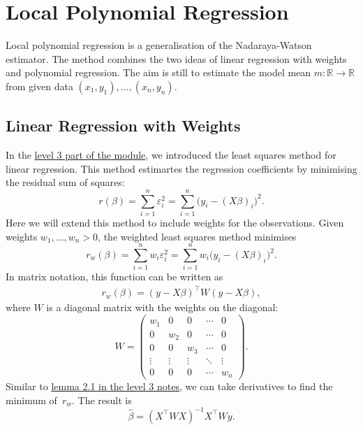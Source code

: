 \documentclass[
  a4paper,
]{article}
\theoremstyle{definition}
\theoremstyle{definition}
\theoremstyle{definition}
\theoremstyle{definition}
\theoremstyle{remark}
\begin{document}
\clearpage

\section{Local Polynomial Regression}\label{X05-locpoly}

Local polynomial regression is a generalisation of the
Nadaraya-Watson estimator. The method combines the two ideas of
linear regression with weights and polynomial regression. The aim
is still to estimate the model mean \(m \colon\mathbb{R}\to \mathbb{R}\) from
given data \((x_1, y_1), \ldots, (x_n, y_n)\).

\subsection{Linear Regression with Weights}\label{linear-regression-with-weights}

In the \href{https://seehuhn.github.io/MATH3714/S02-multiple.html\#the-normal-equations}{level 3 part of the module},
we introduced the least squares method for linear regression. This method
estimartes the regression coefficients by minimising the residual sum of
squares:
\begin{equation*}
  r(\beta)
  = \sum_{i=1}^n \varepsilon_i^2
  = \sum_{i=1}^n \bigl( y_i - (X\beta)_i \bigr)^2.
\end{equation*}
Here we will extend this method to include weights for the observations.
Given weights
\(w_1, \ldots, w_n > 0\), the weighted least squares method minimises
\begin{equation*}
  r_w(\beta)
  = \sum_{i=1}^n w_i \varepsilon_i^2
  = \sum_{i=1}^n w_i \bigl( y_i - (X\beta)_i \bigr)^2.
\end{equation*}
In matrix notation, this function can be written as
\begin{align*}
  r_w(\beta)
  = (y - X \beta)^\top W (y - X \beta),
\end{align*}
where \(W\) is a diagonal matrix with the weights on the diagonal:
\begin{equation}
  W
  = \begin{pmatrix}
      w_1 & 0 & 0 & \cdots & 0 \\
      0 & w_2 & 0 & \cdots & 0 \\
      0 & 0 & w_3 & \cdots & 0 \\
      \vdots & \vdots & \vdots & \ddots & \vdots \\
      0 & 0 & 0 & \cdots & w_n
    \end{pmatrix}.  \label{eq:W-diagonal}
\end{equation}
Similar to \href{https://seehuhn.github.io/MATH3714/S02-multiple.html\#lem:multiple-LSQ}{lemma 2.1 in the level 3 notes},
we can take derivatives to find
the minimum of~\(r_w\). The result is
\begin{equation*}
  \hat\beta
  = (X^\top W X)^{-1} X^\top W y.
\end{equation*}
\end{document}
